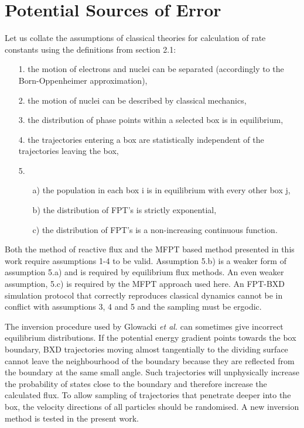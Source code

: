 \section{Potential Sources of Error}
\label{sec:error}

Let us collate the assumptions of classical theories for calculation of rate constants using the definitions from section 2.1:

\begin{itemize}
\item[1.] the motion of electrons and nuclei can be separated (accordingly to the Born-Oppenheimer approximation),
\item[2.] the motion of nuclei can be described by classical mechanics,
\item[3.] the distribution of phase points within a selected box is in equilibrium,
\item[4.] the trajectories entering a box are statistically independent of the trajectories leaving the box,
\item[5.] \begin{itemize} 
\item[a)] the population in each box i is in equilibrium with every other box j,
\item[b)] the distribution of FPT's is strictly exponential,
\item[c)] the distribution of FPT's is a non-increasing continuous function.
\end{itemize}
\end{itemize}
Both the method of reactive flux and the MFPT based method presented in this work require assumptions 1-4 to be valid.
Assumption 5.b) is a weaker form of assumption 5.a) and is required by equilibrium flux methods.
An even weaker assumption, 5.c) is required by the MFPT approach used here.
An FPT-BXD simulation protocol that correctly reproduces classical dynamics cannot be in conflict with assumptions 3, 4 and 5 and the sampling must be ergodic.

The inversion procedure used by Glowacki {\it et al.}\cite{Glowacki2009} can sometimes give incorrect equilibrium distributions.
If the potential energy gradient points towards the box boundary, BXD trajectories moving almost tangentially to the dividing surface cannot leave the neighbourhood of the boundary because they are reflected from the boundary at the same small angle.
Such trajectories will unphysically increase the probability of states close to the boundary and therefore increase the calculated flux.
To allow sampling of trajectories that penetrate deeper into the box, the velocity directions of all particles should be randomised. 
A new inversion method is tested  in the present work.

